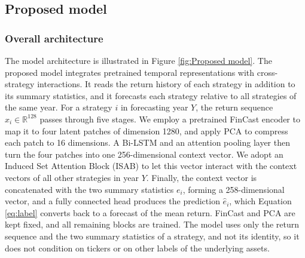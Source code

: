 \documentclass[pdflatex,sn-mathphys-num]{sn-jnl}%
\theoremstyle{thmstyleone}%
\theoremstyle{thmstyletwo}%
\theoremstyle{thmstylethree}%
\begin{document}
\subsection{Proposed model}\label{subsec3}

\subsubsection{Overall architecture}\label{subsubModel1}
The model architecture is illustrated in Figure \ref{fig:Proposed model}. The proposed model integrates pretrained temporal representations with cross-strategy interactions. It reads the return history of each strategy in addition to its summary statistics, and it forecasts each strategy relative to all strategies of the same year. For a strategy $i$ in forecasting year $Y$, the return sequence $x_i \in \mathbb{R}^{128}$ passes through five stages. We employ a pretrained FinCast encoder to map it to four latent patches of dimension 1280, and apply PCA to compress each patch to 16 dimensions. A Bi-LSTM and an attention pooling layer then turn the four patches into one 256-dimensional context vector. We adopt an Induced Set Attention Block (ISAB) to let this vector interact with the context vectors of all other strategies in year $Y$. Finally, the context vector is concatenated with the two summary statistics $e_i$, forming a 258-dimensional vector, and a fully connected head produces the prediction $\hat{e}_i$, which Equation \eqref{eq:label} converts back to a forecast of the mean return. FinCast and PCA are kept fixed, and all remaining blocks are trained. The model uses only the return sequence and the two summary statistics of a strategy, and not its identity, so it does not condition on tickers or on other labels of the underlying assets.
\end{document}

